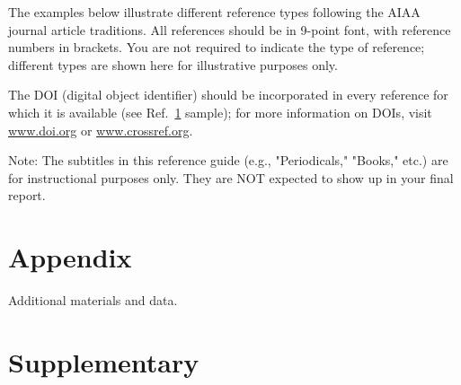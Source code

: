 \documentclass{engr1000j-s2}
\begin{document}
  The examples below illustrate different reference types following the AIAA
  journal article traditions. All references should be in 9-point font, with
  reference numbers in brackets. You are not required to indicate the type of reference;
  different types are shown here for illustrative purposes only.

  The DOI (digital object identifier) should be incorporated in every reference
  for which it is available (see Ref.~\href{https://doi.org/10.1234/example.doi}{1}
  sample); for more information on DOIs, visit \href{https://www.doi.org}{www.doi.org}
  or \href{https://www.crossref.org}{www.crossref.org}.

  Note: The subtitles in this reference guide (e.g., "Periodicals," "Books," etc.)
  are for instructional purposes only. They are NOT expected to show up in your
  final report.

  \newpage
  \section{Appendix}
  Additional materials and data.

  \newpage
  \section{Supplementary}
\end{document}
